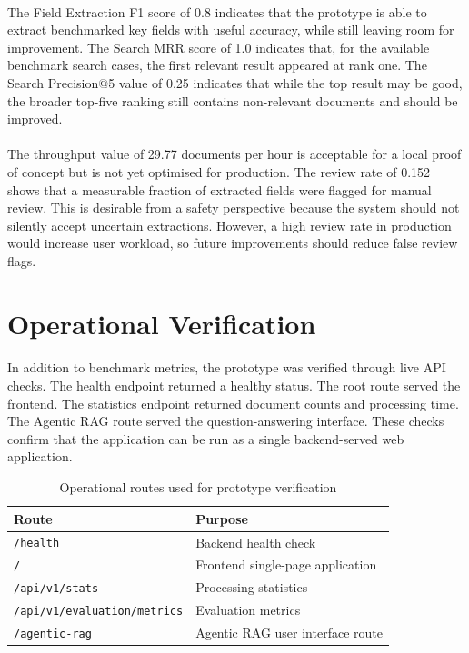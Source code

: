 \paragraph{} The Field Extraction F1 score of 0.8 indicates that the prototype is able to extract benchmarked key fields with useful accuracy, while still leaving room for improvement. The Search MRR score of 1.0 indicates that, for the available benchmark search cases, the first relevant result appeared at rank one. The Search Precision@5 value of 0.25 indicates that while the top result may be good, the broader top-five ranking still contains non-relevant documents and should be improved.

\paragraph{} The throughput value of 29.77 documents per hour is acceptable for a local proof of concept but is not yet optimised for production. The review rate of 0.152 shows that a measurable fraction of extracted fields were flagged for manual review. This is desirable from a safety perspective because the system should not silently accept uncertain extractions. However, a high review rate in production would increase user workload, so future improvements should reduce false review flags.

\section{Operational Verification}
\paragraph{} In addition to benchmark metrics, the prototype was verified through live API checks. The health endpoint returned a healthy status. The root route served the frontend. The statistics endpoint returned document counts and processing time. The Agentic RAG route served the question-answering interface. These checks confirm that the application can be run as a single backend-served web application.

\begin{table}[h]
\centering
\begin{tabular}{ll}
\toprule
\textbf{Route} & \textbf{Purpose} \\
\midrule
\texttt{/health} & Backend health check \\
\texttt{/} & Frontend single-page application \\
\texttt{/api/v1/stats} & Processing statistics \\
\texttt{/api/v1/evaluation/metrics} & Evaluation metrics \\
\texttt{/agentic-rag} & Agentic RAG user interface route \\
\bottomrule
\end{tabular}
\caption{Operational routes used for prototype verification}
\label{tab:operational_routes}
\end{table}

